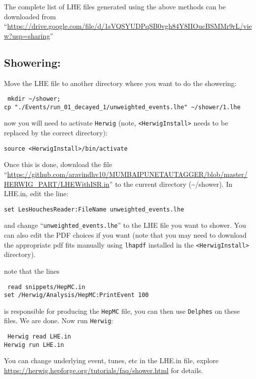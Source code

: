 The complete list of LHE files generated using the above methods can be downloaded from ``\url{https://drive.google.com/file/d/1sVQSYUDPqSB0vgh84Y8IIOucBSMMr9rL/view?usp=sharing}''

\subsection{Showering:}
Move the LHE file to another directory where you want to do the showering:
\begin{center}
    \begin{minipage}{0.8\textwidth}
        {\tt
            mkdir  \textasciitilde/shower;\\
            cp "./Events/run\_01\_decayed\_1/unweighted\_events.lhe" \textasciitilde/shower/1.lhe
        }
    \end{minipage}
\end{center}
now you will need to activate {\tt Herwig} (note, {\tt <HerwigInstall>} needs to be replaced by the correct directory):
\begin{center}
    \begin{minipage}{0.7\textwidth}
        {\tt source <HerwigInstall>/bin/activate}
    \end{minipage}
\end{center}

Once this is done, download the file ``\url{https://github.com/aravindhv10/MUMBAIPUNETAUTAGGER/blob/master/HERWIG_PART/LHEWithISR.in}'' to the current directory (\textasciitilde/shower). In LHE.in, edit the line:
\begin{center}
    \begin{minipage}{0.7\textwidth}
        {\tt set LesHouchesReader:FileName unweighted\_events.lhe}
    \end{minipage}
\end{center}
and change ``{\tt unweighted\_events.lhe}'' to the LHE file you want to shower.
You can also edit the PDF choices if you want (note that you may need to download the appropriate pdf fits manually using {\tt lhapdf} installed in the {\tt <HerwigInstall>} directory).

note that the lines
\begin{center}
    \begin{minipage}{0.7\textwidth}
        {\tt
            read snippets/HepMC.in\\
            set /Herwig/Analysis/HepMC:PrintEvent 100
        }
    \end{minipage}
\end{center}
is responsible for producing the {\tt HepMC} file, you can then use {\tt Delphes} on these files. We are done. Now run {\tt Herwig}:
\begin{center}
    \begin{minipage}{0.7\textwidth}
        {\tt
            Herwig read LHE.in\\
            Herwig run LHE.in
        }
    \end{minipage}
\end{center}
You can change underlying event, tunes, etc in the LHE.in file, explore \url{https://herwig.hepforge.org/tutorials/faq/shower.html} for details.

